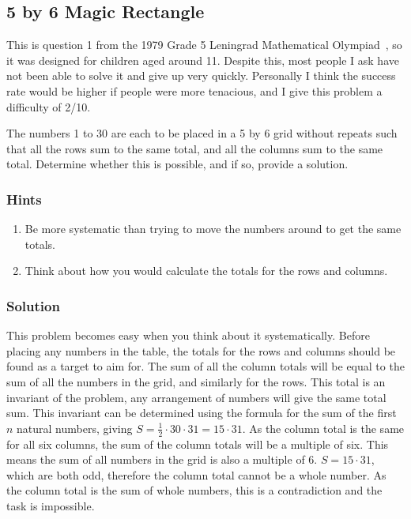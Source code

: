 
\subsection{5 by 6 Magic Rectangle}

This is question 1 from the 1979 Grade 5 Leningrad Mathematical Olympiad~\cite{Grade5LeningradOlympiad}, so it was designed for children aged around 11. Despite this, most people I ask have not been able to solve it and give up very quickly. Personally I think the success rate would be higher if people were more tenacious, and I give this problem a difficulty of 2/10.

The numbers 1 to 30 are each to be placed in a 5 by 6 grid without repeats such that all the rows sum to the same total, and all the columns sum to the same total. Determine whether this is possible, and if so, provide a solution.

\subsubsection{Hints}

\begin{enumerate}
	\item Be more systematic than trying to move the numbers around to get the same totals.
	\item Think about how you would calculate the totals for the rows and columns.
\end{enumerate}

\subsubsection{Solution}

This problem becomes easy when you think about it systematically. Before placing any numbers in the table, the totals for the rows and columns should be found as a target to aim for. The sum of all the column totals will be equal to the sum of all the numbers in the grid, and similarly for the rows. This total is an invariant of the problem, any arrangement of numbers will give the same total sum. This invariant can be determined using the formula for the sum of the first $n$ natural numbers, giving $S = \frac{1}{2} \cdot 30 \cdot 31 = 15 \cdot 31$. As the column total is the same for all six columns, the sum of the column totals will be a multiple of six. This means the sum of all numbers in the grid is also a multiple of 6. $S = 15 \cdot 31$, which are both odd, therefore the column total cannot be a whole number. As the column total is the sum of whole numbers, this is a contradiction and the task is impossible.

